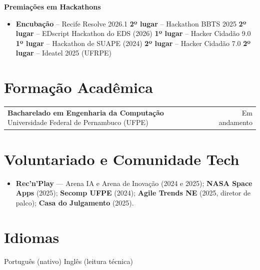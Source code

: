 \documentclass[a4paper,10.5pt]{article}
\makeatletter
\newcommand{\cargo}[3]{%
  \vspace{2pt}
  \begin{tabularx}{\textwidth}{@{}Xr@{}}
    \textbf{#1} \textnormal{\textbar{} #2} & \textcolor{muted}{#3}
  \end{tabularx}%
  \vspace{1pt}
}
\makeatother
\begin{document}
\textbf{Premiações em Hackathons}
\begin{itemize}
    \item \textbf{Encubação} -- Recife Resolve 2026.1 \textbar{} \textbf{2º lugar} -- Hackathon BBTS 2025 \textbar{} \textbf{2º lugar} -- EDscript Hackathon do EDS (2026) \textbar{} \textbf{1º lugar} -- Hacker Cidadão 9.0 \textbar{} \textbf{1º lugar} -- Hackathon de SUAPE (2024) \textbar{} \textbf{2º lugar} -- Hacker Cidadão 7.0 \textbar{} \textbf{2º lugar} -- Ideatel 2025 (UFRPE)
\end{itemize}

\section{Formação Acadêmica}
\cargo{Bacharelado em Engenharia da Computação}{Universidade Federal de Pernambuco (UFPE)}{Em andamento}
\vspace{2pt}

\vspace{-1.5em}
\section{Voluntariado e Comunidade Tech}
\begin{itemize}
  \item \textbf{Rec'n'Play} --- Arena IA e Arena de Inovação (2024 e 2025); \textbf{NASA Space Apps} (2025); \textbf{Secomp UFPE} (2024); \textbf{Agile Trends NE} (2025, diretor de palco); \textbf{Casa do Julgamento} (2025).
\end{itemize}

\section{Idiomas}
Português (nativo) \textbar{} Inglês (leitura técnica)
\end{document}
